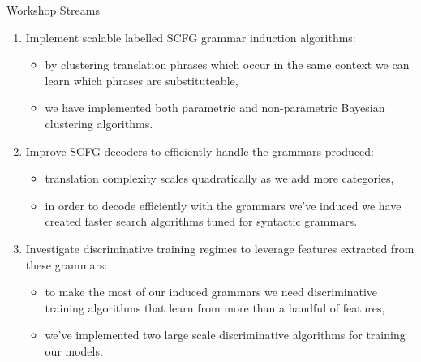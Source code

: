 \documentclass{beamer}
\begin{document}
\begin{frame}[t]{Workshop Streams}
\begin{enumerate}
\item Implement scalable labelled SCFG grammar induction algorithms:
\begin{itemize}
\item by clustering translation phrases which occur in the same context we can learn which phrases are substituteable,
\item we have implemented both parametric and non-parametric Bayesian clustering algorithms.
\end{itemize}
\item Improve SCFG decoders to efficiently handle the grammars produced:
\begin{itemize}
\item translation complexity scales quadratically as we add more categories,
\item in order to decode efficiently with the grammars we've induced we have created faster search algorithms tuned for syntactic grammars.
\end{itemize}
\item Investigate discriminative training regimes to leverage features extracted from these grammars:
\begin{itemize}
\item to make the most of our induced grammars we need discriminative training algorithms that learn from more than a handful of features,
\item we've implemented two large scale discriminative algorithms for training our models.
\end{itemize}
\end{enumerate}
\end{frame}
\end{document}
